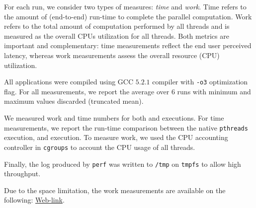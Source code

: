   For each run, we consider two types of measures: \emph{time} and
 {\em work}.  Time refers to the amount of (end-to-end)
run-time to complete the parallel computation.  Work refers to the total amount of
computation performed by all threads and is measured as the overall CPUs utilization for all threads. 
Both metrics are important
and complementary: time measurements reflect the end user perceived latency,
whereas work measurements assess the overall resource (CPU) utilization.


 All applications were compiled using
GCC $5.2.1$ compiler with {\tt -o3} optimization flag. For all
measurements, we report the average over $6$ runs with minimum and maximum values
discarded (truncated mean).

 We measured work and time numbers for both \pthreads and \projecttitle executions. For time measurements, we report the run-time comparison between the native {\tt pthreads} execution, and \projecttitle execution.   To measure work, we used the CPU accounting controller in {\tt cgroups} to account the CPU usage of all threads. 

Finally, the log produced by
{\tt perf} was written to {\tt /tmp} on {\tt tmpfs} to allow high throughput.


   Due to the space limitation, the work measurements are available on the following: \href{https://mic92.github.io/inspector/index.html}{Web-link}.




